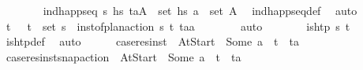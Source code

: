 \begin{isabellebody}
\ \ \ \ \ \ \isamarkupfalse%
\ {\isacartoucheopen}ind{\isacharunderscore}{\kern0pt}happ{\isacharunderscore}{\kern0pt}seq\ {\isasympi}s\ hs{\isacartoucheclose}\ {\isacartoucheopen}{\isacharparenleft}{\kern0pt}t\isactrlsub a{\isacharcomma}{\kern0pt}A{\isacharparenright}{\kern0pt}\ {\isasymin}\ set\ hs{\isacartoucheclose}\ {\isacartoucheopen}a\ {\isasymin}\ set\ A{\isacartoucheclose}\ \isamarkupfalse%
\ ind{\isacharunderscore}{\kern0pt}happ{\isacharunderscore}{\kern0pt}seq{\isacharunderscore}{\kern0pt}def\ \isamarkupfalse%
\ auto\isanewline
\ \ \ \ \isamarkupfalse%
\ \isamarkupfalse%
\ t\isactrlsub {\isasympi}\ {\isasympi}\ \ {\isachardoublequoteopen}{\isacharparenleft}{\kern0pt}t\isactrlsub {\isasympi}{\isacharcomma}{\kern0pt}{\isasympi}{\isacharparenright}{\kern0pt}\ {\isasymin}\ set\ {\isasympi}s{\isachardoublequoteclose}\ \ {\isachardoublequoteopen}inst{\isacharunderscore}{\kern0pt}of{\isacharunderscore}{\kern0pt}plan{\isacharunderscore}{\kern0pt}action\ {\isasympi}s\ {\isacharparenleft}{\kern0pt}t\isactrlsub {\isasympi}{\isacharcomma}{\kern0pt}{\isasympi}{\isacharparenright}{\kern0pt}\ {\isacharparenleft}{\kern0pt}t\isactrlsub a{\isacharcomma}{\kern0pt}a{\isacharparenright}{\kern0pt}{\isachardoublequoteclose}\isanewline
\ \ \ \ \ \ \isamarkupfalse%
\ auto\isanewline
\ \ \ \ \isamarkupfalse%
\ \isamarkupfalse%
\ {\isachardoublequoteopen}is{\isacharunderscore}{\kern0pt}htp\ {\isasympi}s\ t\isactrlsub {\isasympi}{\isachardoublequoteclose}\isanewline
\ \ \ \ \ \ \isamarkupfalse%
\ is{\isacharunderscore}{\kern0pt}htp{\isacharunderscore}{\kern0pt}def\ \isamarkupfalse%
\ auto\isanewline
\ \ \ \ \isamarkupfalse%
\ {\isacharquery}{\kern0pt}case{}{\isacharequal}{\kern0pt}{\isachardoublequoteopen}res{\isacharunderscore}{\kern0pt}inst\ {\isasympi}\ At{\isacharunderscore}{\kern0pt}Start\ {\isacharequal}{\kern0pt}\ Some\ a\ {\isasymand}\ t\isactrlsub {\isasympi}\ {\isacharequal}{\kern0pt}\ t\isactrlsub a{\isachardoublequoteclose}\isanewline
\ \ \ \ \isamarkupfalse%
\ {\isacharquery}{\kern0pt}case{}{\isacharequal}{\kern0pt}{\isachardoublequoteopen}res{\isacharunderscore}{\kern0pt}inst{\isacharunderscore}{\kern0pt}snap{\isacharunderscore}{\kern0pt}action\ {\isasympi}\ At{\isacharunderscore}{\kern0pt}Start\ {\isacharequal}{\kern0pt}\ Some\ a\ {\isasymand}\ t\isactrlsub {\isasympi}\ {\isacharequal}{\kern0pt}\ t\isactrlsub a{\isachardoublequoteclose}\isanewline

\end{isabellebody}
